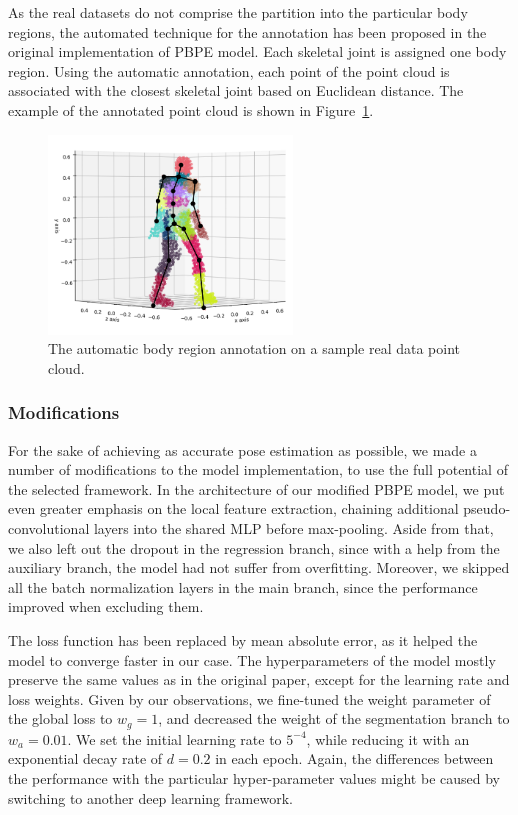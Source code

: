 \noindent 
As the real datasets do not comprise the partition into the particular body regions, the automated technique for the annotation has been proposed in the original implementation of PBPE model. Each skeletal joint is assigned one body region. Using the automatic annotation, each point of the point cloud is associated with the closest skeletal joint based on Euclidean distance. The example of the annotated point cloud is shown in Figure~\ref{fig:reg_annotation}.\par 

\vspace{5mm}
\begin{figure}[H]
\begin{center}
  \includegraphics[height=200px]{images/implementation/region_annotation.png}
  \caption[The automatic body region annotation on real data.]{The automatic body region annotation on a sample real data point cloud.}
  \label{fig:reg_annotation}
\end{center}
\end{figure}

\subsubsection{Modifications}
For the sake of achieving as accurate pose estimation as possible, we made a number of modifications to the model implementation, to use the full potential of the selected framework. In the architecture of our modified PBPE model, we put even greater emphasis on the local feature extraction, chaining additional pseudo-convolutional layers into the shared MLP before max-pooling. Aside from that, we also left out the dropout in the regression branch, since with a help from the auxiliary branch, the model had not suffer from overfitting. Moreover, we skipped all the batch normalization layers in the main branch, since the performance improved when excluding them.\par
\vspace{5mm}
\noindent
The loss function has been replaced by mean absolute error, as it helped the model to converge faster in our case. The hyperparameters of the model mostly preserve the same values as in the original paper, except for the learning rate and loss weights. Given by our observations, we fine-tuned the weight parameter of the global loss to $w_g=1$, and decreased the weight of the segmentation branch to $w_a = 0.01$. We set the initial learning rate to $5^{-4}$, while reducing it with an exponential decay rate of $d = 0.2$ in each epoch. Again, the differences between the performance with the particular hyper-parameter values might be caused by switching to another deep learning framework. 

